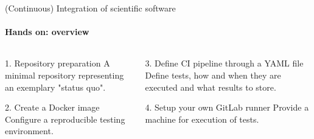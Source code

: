 \begin{frame}{(Continuous) Integration of scientific software}
    \framesubtitle{Hands on: overview}
    \begin{columns}
    \begin{column}{0.48\textwidth}
        \begin{block}{1. Repository preparation}
            A minimal repository representing an exemplary
            "status quo".
        \end{block}
        \begin{exampleblock}{2. Create a Docker image}
            Configure a reproducible testing environment.
        \end{exampleblock}
    \end{column}

    \begin{column}{0.48\textwidth}
        \begin{block}{3. Define CI pipeline through a YAML file}
            Define tests, how and when they are executed and what
            results to store.
        \end{block}
        \begin{block}{4. Setup your own GitLab runner}
            Provide a machine for execution of tests.
        \end{block}
    \end{column}
    \end{columns}
\end{frame}


